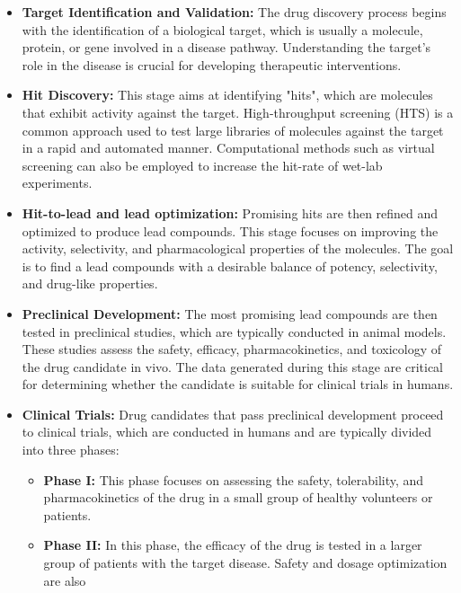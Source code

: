 \begin{itemize}
      \item \textbf{Target Identification and Validation:} The drug discovery process begins with the
            identification of a biological target, which is usually a molecule, protein, or gene involved
            in a disease pathway. Understanding the target's role in the disease is crucial for developing
            therapeutic interventions.
      \item \textbf{Hit Discovery:} This stage aims at identifying "hits", which are molecules that
            exhibit activity against the target. High-throughput screening (HTS) is a common approach
            used to test large libraries of molecules against the target in a rapid and automated manner.
            Computational methods such as virtual screening can also be employed to increase the hit-rate
            of wet-lab experiments.
      \item \textbf{Hit-to-lead and lead optimization:} Promising hits are then refined and optimized to produce lead
            compounds. This stage focuses on improving the activity, selectivity, and pharmacological
            properties of the molecules. The goal is to find a lead compounds with a desirable balance of potency,
            selectivity, and drug-like properties.
      \item \textbf{Preclinical Development:} The most promising lead compounds are then tested in
            preclinical studies, which are typically conducted in animal models. These studies assess the
            safety, efficacy, pharmacokinetics, and toxicology of the drug candidate in vivo. The data
            generated during this stage are critical for determining whether the candidate is suitable for
            clinical trials in humans.
      \item \textbf{Clinical Trials:} Drug candidates that pass preclinical development proceed to
            clinical trials, which are conducted in humans and are typically divided into three phases:
            \begin{itemize}
                  \item \textbf{Phase I:} This phase focuses on assessing the safety, tolerability, and
                        pharmacokinetics of the drug in a small group of healthy volunteers or patients.
                  \item \textbf{Phase II:} In this phase, the efficacy of the drug is tested in a larger
                        group of patients with the target disease. Safety and dosage optimization are also

\end{itemize}
\end{itemize}
